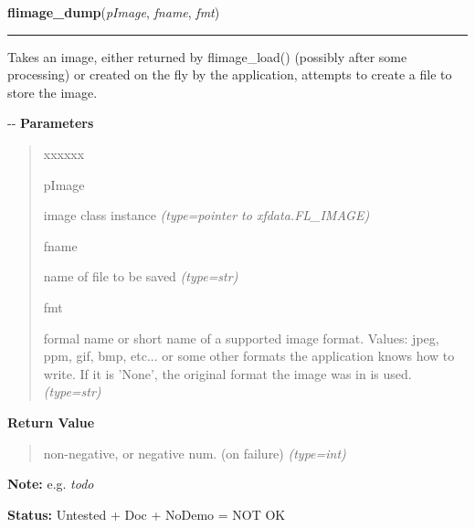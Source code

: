 \hspace{.8\funcindent}\begin{boxedminipage}{\funcwidth}

    \raggedright \textbf{flimage\_dump}(\textit{pImage}, \textit{fname}, \textit{fmt})

    \vspace{-1.5ex}

    \rule{\textwidth}{0.5\fboxrule}
\setlength{\parskip}{2ex}

Takes an image, either returned by flimage\_load() (possibly after some
processing) or created on the fly by the application, attempts to create
a file to store the image.

-{}-
\setlength{\parskip}{1ex}
      \textbf{Parameters}
      \vspace{-1ex}

      \begin{quote}
        \begin{Ventry}{xxxxxx}

          \item[pImage]


image class instance
            {\it (type=pointer to xfdata.FL\_IMAGE)}

          \item[fname]


name of file to be saved
            {\it (type=str)}

          \item[fmt]


formal name or short name of a supported image format. Values: jpeg,
ppm, gif, bmp, etc... or some other formats the application knows
how to write. If it is 'None', the original format the image was in
is used.
            {\it (type=str)}

        \end{Ventry}

      \end{quote}

      \textbf{Return Value}
    \vspace{-1ex}

      \begin{quote}

non-negative, or negative num. (on failure)
      {\it (type=int)}

      \end{quote}

\textbf{Note:} 
e.g. \emph{todo}


\textbf{Status:} 
Untested + Doc + NoDemo = NOT OK


    \end{boxedminipage}

